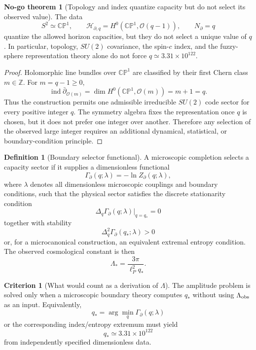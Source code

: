 \documentclass[aps,prd,reprint,nofootinbib,superscriptaddress,floatfix]{revtex4-2}
\numberwithin{equation}{section}
\theoremstyle{definition}
\newtheorem{definition}{Definition}[section]
\newtheorem{criterion}{Criterion}[section]
\newtheorem{nogotheorem}{No-go theorem}[section]
\theoremstyle{plain}
\newcommand{\CP}{\mathbb{CP}}
\newcommand{\Ncap}{N_{\partial}}
\begin{document}
\begin{nogotheorem}[Topology and index quantize capacity but do not select its observed value]
\label{nogo:q-selection}
The data
\[
S^2\simeq \CP^1,\qquad
\mathcal H_{\partial,q}=H^0(\CP^1,\mathcal O(q-1)),
\qquad
\Ncap=q
\]
quantize the allowed horizon capacities, but they do not select a unique value of \(q\).  In particular, topology, \(SU(2)\) covariance, the spin-\(c\) index, and the fuzzy-sphere representation theory alone do not force \(q\simeq 3.31\times10^{122}\).
\end{nogotheorem}

\begin{proof}
Holomorphic line bundles over \(\CP^1\) are classified by their first Chern class \(m\in\mathbb Z\).  For \(m=q-1\ge0\),
\[
\operatorname{ind}\bar\partial_{\mathcal O(m)}
=\dim H^0(\CP^1,\mathcal O(m))=m+1=q.
\]
Thus the construction permits one admissible irreducible \(SU(2)\) code sector for every positive integer \(q\).  The symmetry algebra fixes the representation once \(q\) is chosen, but it does not prefer one integer over another.  Therefore any selection of the observed large integer requires an additional dynamical, statistical, or boundary-condition principle.
\end{proof}

\begin{definition}[Boundary selector functional]
A microscopic completion selects a capacity sector if it supplies a dimensionless functional
\[
\Gamma_\partial(q;\lambda)
=
-\ln Z_\partial(q;\lambda),
\]
where \(\lambda\) denotes all dimensionless microscopic couplings and boundary conditions, such that the physical sector satisfies the discrete stationarity condition
\[
\boxed{
\Delta_q\Gamma_\partial(q;\lambda)\big|_{q=q_*}=0
}
\]
together with stability
\[
\Delta_q^2\Gamma_\partial(q_*;\lambda)>0
\]
or, for a microcanonical construction, an equivalent extremal entropy condition.  The observed cosmological constant is then
\[
\Lambda_*=\frac{3\pi}{\ell_P^2q_*}.
\]
\end{definition}

\begin{criterion}[What would count as a derivation of \(\Lambda\)]
The amplitude problem is solved only when a microscopic boundary theory computes \(q_*\) without using \(\Lambda_{\rm obs}\) as an input.  Equivalently,
\[
q_*=\arg\min_q\Gamma_\partial(q;\lambda)
\]
or the corresponding index/entropy extremum must yield
\[
q_*\simeq 3.31\times10^{122}
\]
from independently specified dimensionless data.
\end{criterion}
\end{document}
